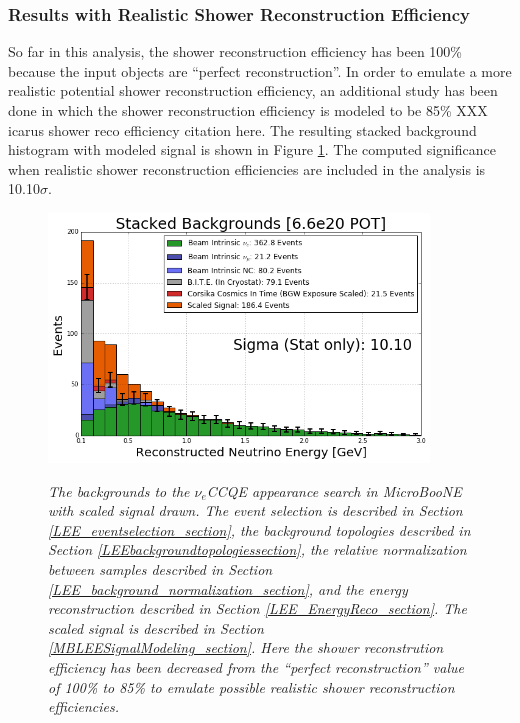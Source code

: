 \subsubsection{Results with Realistic Shower Reconstruction Efficiency}
So far in this analysis, the shower reconstruction efficiency has been 100\% because the input objects are ``perfect reconstruction''. In order to emulate a more realistic potential shower reconstruction efficiency, an additional study has been done in which the shower reconstruction efficiency is modeled to be 85\% XXX icarus shower reco efficiency citation here. The resulting stacked background histogram with modeled signal is shown in Figure \ref{LEE_recoemu_fullstack_fig}. The computed significance when realistic shower reconstruction efficiencies are included in the analysis is 10.10$\sigma$.


\begin{figure}[ht!]
\centering
\includegraphics[width=0.9\textwidth]{Figures/LEE_recoemu_fullstack_WithAnalysisCuts.png}\\
\caption{\textit{The backgrounds to the $\nu_e$CCQE appearance search in MicroBooNE with scaled signal drawn. The event selection is described in Section \ref{LEE_eventselection_section}, the background topologies described in Section \ref{LEEbackgroundtopologiessection}, the relative normalization between samples described in Section \ref{LEE_background_normalization_section}, and the energy reconstruction described in Section \ref{LEE_EnergyReco_section}. The scaled signal is described in Section \ref{MBLEESignalModeling_section}. Here the shower reconstrution efficiency has been decreased from the ``perfect reconstruction'' value of 100\% to 85\% to emulate possible realistic shower reconstruction efficiencies.}}
\label{LEE_recoemu_fullstack_fig}
\end{figure}

